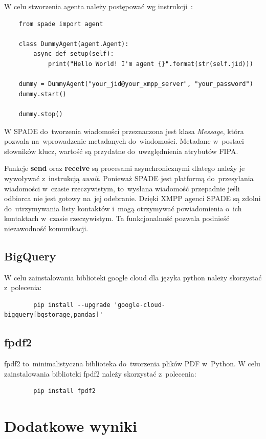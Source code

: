 \documentclass[11pt]{report}
\begin{document}
    W celu stworzenia agenta należy postępować wg instrukcji~\cite{SPADEquickstart}:
    \begin{verbatim}
    from spade import agent

    class DummyAgent(agent.Agent):
        async def setup(self):
            print("Hello World! I'm agent {}".format(str(self.jid)))

    dummy = DummyAgent("your_jid@your_xmpp_server", "your_password")
    dummy.start()

    dummy.stop()
    \end{verbatim}

    W SPADE do~tworzenia wiadomości przeznaczona jest klasa \textit{Message},
    która pozwala na~wprowadzenie metadanych do~wiadomości.
    Metadane w~postaci słowników klucz, wartość są przydatne do~uwzględnienia atrybutów FIPA\@.

    Funkcje \textbf{send} oraz \textbf{receive} są procesami asynchronicznymi dlatego należy je wywoływać z~instrukcją \textit{await}.
    Ponieważ SPADE jest platformą do~przesyłania wiadomości w~czasie rzeczywistym,
    to~wysłana wiadomość przepadnie jeśli odbiorca nie jest gotowy na~jej odebranie.
    Dzięki XMPP agenci SPADE są zdolni do~utrzymywania listy kontaktów i~mogą otrzymywać powiadomienia o~ich kontaktach w~czasie rzeczywistym.
    Ta funkcjonalność pozwala podnieść niezawodność komunikacji.


    \section{BigQuery}
    W celu zainstalowania biblioteki google cloud dla języka python należy skorzystać z~polecenia:
    \begin{verbatim}
        pip install --upgrade 'google-cloud-bigquery[bqstorage,pandas]'
    \end{verbatim}


    \section{fpdf2}
    fpdf2 to~minimalistyczna biblioteka do~tworzenia plików PDF w~Python.
    W celu zainstalowania biblioteki fpdf2 należy skorzystać z~polecenia:
    \begin{verbatim}
        pip install fpdf2
    \end{verbatim}


    \chapter{Dodatkowe wyniki}
\end{document}
